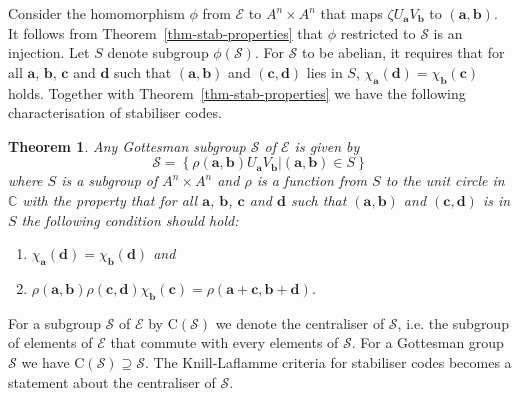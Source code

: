 \documentclass[11pt,twoside]{article}
\newtheorem{theorem}{Theorem}[section]
\theoremstyle{definition}
\theoremstyle{remark}
\newcommand{\Centre}[1]{\ensuremath{\mathrm{C}\left(#1\right)}}
\begin{document}
Consider the homomorphism $\phi$ from $\mathcal{E}$ to $A^n \times
A^n$ that maps $\zeta U_\mathbf{a} V_\mathbf{b}$ to
$(\mathbf{a},\mathbf{b})$. It follows {from}
Theorem~\ref{thm-stab-properties} that $\phi$ restricted to
$\mathcal{S}$ is an injection. Let $S$ denote subgroup
$\phi(\mathcal{S})$. For $\mathcal{S}$ to be abelian, it requires that
for all $\mathbf{a}$, $\mathbf{b}$, $\mathbf{c}$ and $\mathbf{d}$ such
that $(\mathbf{a},\mathbf{b})$ and $(\mathbf{c},\mathbf{d})$ lies in
$S$, $\chi_\mathbf{a}(\mathbf{d}) = \chi_\mathbf{b}(\mathbf{c})$
holds. Together with Theorem~\ref{thm-stab-properties} we have the
following characterisation of stabiliser codes.

\begin{theorem}\label{thm-classify-gottesman}
  Any Gottesman subgroup $\mathcal{S}$ of $\mathcal{E}$ is given by
  \[ 
  \mathcal{S} = \left\{ \rho(\mathbf{a},\mathbf{b}) U_\mathbf{a}
    V_\mathbf{b} | (\mathbf{a},\mathbf{b}) \in S \right\}
  \]
  where $S$ is a subgroup of $A^n \times A^n$ and $\rho$ is a function
  {from} $S$ to the unit circle in $\mathbb{C}$ with the property that
  for all $\mathbf{a}$, $\mathbf{b}$, $\mathbf{c}$ and $\mathbf{d}$
  such that $(\mathbf{a},\mathbf{b})$ and $(\mathbf{c},\mathbf{d})$ is
  in $S$ the following condition should hold:
  \begin{enumerate}
  \item $\chi_\mathbf{a}(\mathbf{d}) = \chi_\mathbf{b}(\mathbf{d})$
    and
  \item $\rho(\mathbf{a},\mathbf{b}) \rho(\mathbf{c},\mathbf{d})
    \chi_\mathbf{b}(\mathbf{c}) = \rho(\mathbf{a}+
    \mathbf{c},\mathbf{b} + \mathbf{d})$.
  \end{enumerate}
\end{theorem}


For a subgroup $\mathcal{S}$ of $\mathcal{E}$ by
$\Centre{\mathcal{S}}$ we denote the centraliser of $\mathcal{S}$,
i.e. the subgroup of elements of $\mathcal{E}$ that commute with every
elements of $\mathcal{S}$. For a Gottesman group $\mathcal{S}$ we
have $\Centre{\mathcal{S}} \supseteq \mathcal{S}$.  The Knill-Laflamme
criteria for stabiliser codes becomes a statement about the
centraliser of $\mathcal{S}$.
\end{document}
